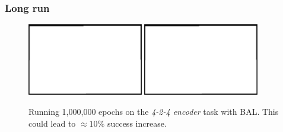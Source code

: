 
\subsubsection{Long run} 
\label{sec:results-long-run} 

\begin{figure}[H]
  \centering
  \includegraphics[width=0.45\textwidth]{img/placeholder.png}  %
  \includegraphics[width=0.45\textwidth]{img/placeholder.png}  %
  \caption{Running 1,000,000 epochs on the \emph{4-2-4 encoder} task with BAL. This could lead to $\approx 10\%$ success increase.}
  \label{fig:results-tlr-auto4-long-run}
\end{figure}



 
